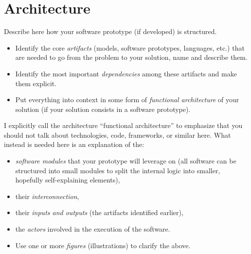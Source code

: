 \section{Architecture}
\label{sec:architecture}
Describe here how your software prototype (if developed) is structured. 

\begin{itemize}
\item[\Square] Identify the core \emph{artifacts} (models, software prototypes, languages, etc.) that are needed to go from the problem to your solution, name and describe them.
\item[\Square] Identify the most important \emph{dependencies} among these artifacts and make them explicit.
\item[\Square] Put everything into context in some form of \emph{functional architecture} of your solution (if your solution consists in a software prototype).
\end{itemize}

I explicitly call the architecture ``functional architecture'' to emphasize that you should not talk about technologies, code, frameworks, or similar here. What instead is needed here is an explanation of the:

\begin{itemize}
\item[\Square] \emph{software modules} that your prototype will leverage on (all software can be structured into small modules to split the internal logic into smaller, hopefully self-explaining elements),
\item[\Square] their \emph{interconnection},
\item[\Square] their \emph{inputs and outputs} (the artifacts identified earlier), 
\item[\Square] the \emph{actors} involved in the execution of the software.
\item[\Square] Use one or more \emph{figures} (illustrations) to clarify the above.
\end{itemize}


